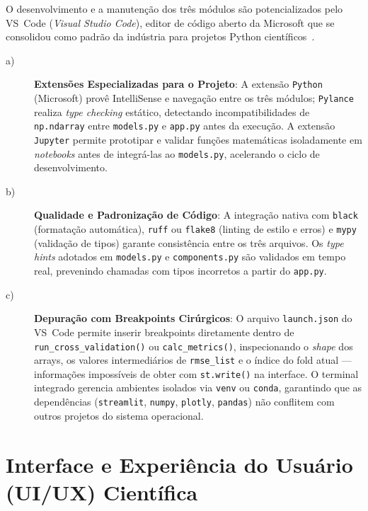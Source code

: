 O desenvolvimento e a manutenção dos três módulos são potencializados pelo VS~Code
(\textit{Visual Studio Code}), editor de código aberto da Microsoft que se consolidou
como padrão da indústria para projetos Python científicos~\cite{vscode2024}.

\begin{description}

\item[a)] \textbf{Extensões Especializadas para o Projeto}: A extensão \texttt{Python}
(Microsoft) provê IntelliSense e navegação entre os três módulos; \texttt{Pylance} realiza
\textit{type checking} estático, detectando incompatibilidades de \texttt{np.ndarray}
entre \texttt{models.py} e \texttt{app.py} antes da execução. A extensão
\texttt{Jupyter} permite prototipar e validar funções matemáticas isoladamente em
\textit{notebooks} antes de integrá-las ao \texttt{models.py}, acelerando o ciclo de
desenvolvimento.

\item[b)] \textbf{Qualidade e Padronização de Código}: A integração nativa com
\texttt{black} (formatação automática), \texttt{ruff} ou \texttt{flake8} (linting de
estilo e erros) e \texttt{mypy} (validação de tipos) garante consistência entre os três
arquivos. Os \textit{type hints} adotados em \texttt{models.py} e \texttt{components.py}
são validados em tempo real, prevenindo chamadas com tipos incorretos a partir do
\texttt{app.py}.

\item[c)] \textbf{Depuração com Breakpoints Cirúrgicos}: O arquivo \texttt{launch.json}
do VS~Code permite inserir breakpoints diretamente dentro de
\texttt{run\_cross\_validation()} ou \texttt{calc\_metrics()}, inspecionando o
\textit{shape} dos arrays, os valores intermediários de \texttt{rmse\_list} e o índice
do fold atual — informações impossíveis de obter com \texttt{st.write()} na interface.
O terminal integrado gerencia ambientes isolados via \texttt{venv} ou \texttt{conda},
garantindo que as dependências (\texttt{streamlit}, \texttt{numpy}, \texttt{plotly},
\texttt{pandas}) não conflitem com outros projetos do sistema operacional.

\end{description}


\chapter{Interface e Experiência do Usuário (UI/UX) Científica}


